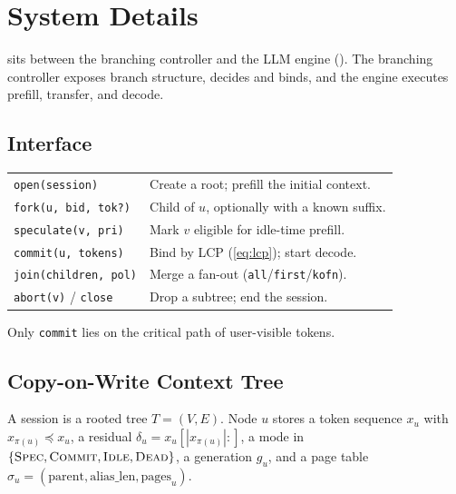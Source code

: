 \section{System Details}
\label{sec:design-full}

\sys sits between the branching controller and the LLM engine ().
The branching controller exposes branch structure, \sys decides and binds, and the engine executes prefill, transfer, and decode.

\subsection{Interface}
\label{sec:overview}
\begin{center}
\footnotesize
\setlength{\tabcolsep}{3pt}
\begin{tabular}{@{}lp{}@{}}
\toprule
\texttt{open(session)} & Create a root; prefill the initial context. \\
\texttt{fork(u, bid, tok?)} & Child of $u$, optionally with a known suffix. \\
\texttt{speculate(v, pri)} & Mark $v$ eligible for idle-time prefill. \\
\texttt{commit(u, tokens)} & Bind by LCP (\eqref{eq:lcp}); start decode. \\
\texttt{join(children, pol)} & Merge a fan-out (\texttt{all}/\texttt{first}/\texttt{kofn}). \\
\texttt{abort(v)} / \texttt{close} & Drop a subtree; end the session. \\
\bottomrule
\end{tabular}
\end{center}
Only \texttt{commit} lies on the critical path of user-visible tokens.

\subsection{Copy-on-Write Context Tree}
\label{sec:state}

\begin{definition}
A session is a rooted tree $T=(V,E)$.
Node $u$ stores a token sequence $x_u$ with $x_{\pi(u)}\preceq x_u$, a residual $\delta_u=x_u[|x_{\pi(u)}|{:}]$, a mode in $\{\textsc{Spec},\textsc{Commit},\textsc{Idle},\textsc{Dead}\}$, a generation $g_u$, and a page table $\sigma_u=(\mathrm{parent},\mathrm{alias\_len},\mathrm{pages}_u)$.
\end{definition}

